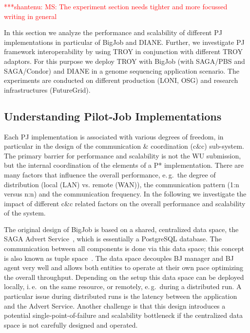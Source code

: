 \documentclass[conference,final]{IEEEtran}
\newcommand{\jhanote}[1]{ {\textcolor{red} { ***shantenu: #1 }}}
\newcommand{\jhanote}[1]{}
\begin{document}
\jhanote{MS: The experiment section needs tighter and more focussed
  writing in general}

In this section we analyze the performance and scalability of different PJ
implementations in particular of BigJob and DIANE. Further, we investigate PJ
framework interoperability by using TROY in conjunction with different TROY 
adaptors. For this purpose we deploy TROY with BigJob (with SAGA/PBS and 
SAGA/Condor) and DIANE in a genome sequencing application scenario. The 
experiments are conducted on different production (LONI, OSG) and research
infrastructures (FutureGrid).

\subsection{Understanding Pilot-Job Implementations}
\label{sec:pj_performance}
Each PJ implementation is associated with various degrees of freedom,
in particular in the design of the communication \& coordination
(c\&c) sub-system.  The primary barrier for performance and
scalability is not the WU submission, but the internal coordination of
the elements of a P* implementation. There are many factors that
influence the overall performance, e.\,g.\ the degree of distribution
(local (LAN) vs. remote (WAN)), the communication pattern (1:n versus
n:n) and the communication frequency. In the following we investigate
the impact of different c\&c related factors on the overall
performance and scalability of the system.

The original design of BigJob is based on a shared, centralized data
space, the SAGA Advert Service~\cite{saga_advert}, which is
essentially a PostgreSQL database. The communication between all
components is done via this data space; this concept is also known as
tuple space~\cite{Gelernter:1985:GCL:2363.2433}.  The data space
decouples BJ manager and BJ agent very well and allows both entities
to operate at their own pace optimizing the overall throughput.
Depending on the setup this data space can be deployed locally,
i.\,e.\ on the same resource, or remotely, e.\,g.\ during a
distributed run. A particular issue during distributed runs is the
latency between the application and the Advert Service. Another
challenge is that this design introduces a potential
single-point-of-failure and scalability bottleneck if the centralized
data space is not carefully designed and operated.
\end{document}
